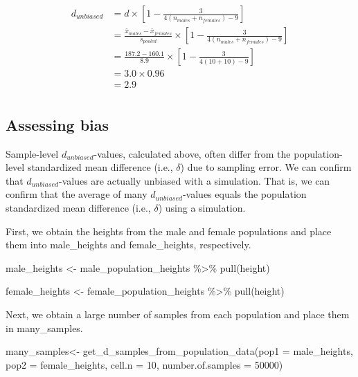 \documentclass[
]{krantz}
\makeatletter
\newenvironment{Shaded}{\begin{snugshade}}{\end{snugshade}}
\newcommand{\AttributeTok}[1]{\textcolor[rgb]{0.61,0.61,0.61}{#1}}
\newcommand{\DecValTok}[1]{\textcolor[rgb]{0.06,0.06,0.06}{#1}}
\newcommand{\FunctionTok}[1]{\textcolor[rgb]{0,0,0}{#1}}
\newcommand{\NormalTok}[1]{#1}
\newcommand{\OtherTok}[1]{\textcolor[rgb]{0.37,0.37,0.37}{#1}}
\newcommand{\SpecialCharTok}[1]{\textcolor[rgb]{0,0,0}{#1}}
\newenvironment{kframe}{%
\medskip{}
\setlength{\fboxsep}{.8em}
 \def\at@end@of@kframe{}%
 \ifinner\ifhmode%
  \def\at@end@of@kframe{\end{minipage}}%
  \begin{minipage}{\columnwidth}%
 \fi\fi%
 \def\FrameCommand##1{\hskip\@totalleftmargin \hskip-\fboxsep
 \colorbox{shadecolor}{##1}\hskip-\fboxsep
     \hskip-\linewidth \hskip-\@totalleftmargin \hskip\columnwidth}%
 \MakeFramed {\advance\hsize-\width
   \@totalleftmargin\z@ \linewidth\hsize
   \@setminipage}}%
 {\par\unskip\endMakeFramed%
 \at@end@of@kframe}
\renewenvironment{Shaded}{\begin{kframe}}{\end{kframe}}
\makeatother
\begin{document}
\[
\begin{aligned}
d_{unbiased}  &= d \times [1 - \frac{3}{4(n_{males} + n_{females})-9}] \\
&= \frac{\bar{x}_{males} - \bar{x}_{females}}{s_{pooled}} \times [1 - \frac{3}{4(n_{males} + n_{females})-9}] \\
&= \frac{187.2 - 160.1}{8.9} \times [1 - \frac{3}{4(10 + 10)-9}] \\
&= 3.0 \times 0.96\\
&= 2.9\\
\end{aligned}
\]

\hypertarget{assessing-bias-2}{%
\subsection{Assessing bias}\label{assessing-bias-2}}

Sample-level \(d_{unbiased}\)-values, calculated above, often differ from the population-level standardized mean difference (i.e., \(\delta\)) due to sampling error. We can confirm that \(d_{unbiased}\)-values are actually unbiased with a simulation. That is, we can confirm that the average of many \(d_{unbiased}\)-values equals the population standardized mean difference (i.e., \(\delta\)) using a simulation.

First, we obtain the heights from the male and female populations and place them into male\_heights and female\_heights, respectively.

\begin{Shaded}
\begin{Highlighting}[]
\NormalTok{male\_heights }\OtherTok{\textless{}{-}}\NormalTok{ male\_population\_heights }\SpecialCharTok{\%\textgreater{}\%} 
  \FunctionTok{pull}\NormalTok{(height)}

\NormalTok{female\_heights }\OtherTok{\textless{}{-}}\NormalTok{ female\_population\_heights }\SpecialCharTok{\%\textgreater{}\%} 
  \FunctionTok{pull}\NormalTok{(height)}
\end{Highlighting}
\end{Shaded}

Next, we obtain a large number of samples from each population and place them in many\_samples.

\begin{Shaded}
\begin{Highlighting}[]
\NormalTok{many\_samples}\OtherTok{\textless{}{-}}  \FunctionTok{get\_d\_samples\_from\_population\_data}\NormalTok{(}\AttributeTok{pop1 =}\NormalTok{ male\_heights,}
                                   \AttributeTok{pop2 =}\NormalTok{ female\_heights,}
                                   \AttributeTok{cell.n =} \DecValTok{10}\NormalTok{,}
                                   \AttributeTok{number.of.samples =} \DecValTok{50000}\NormalTok{)}
\end{Highlighting}
\end{Shaded}
\end{document}
